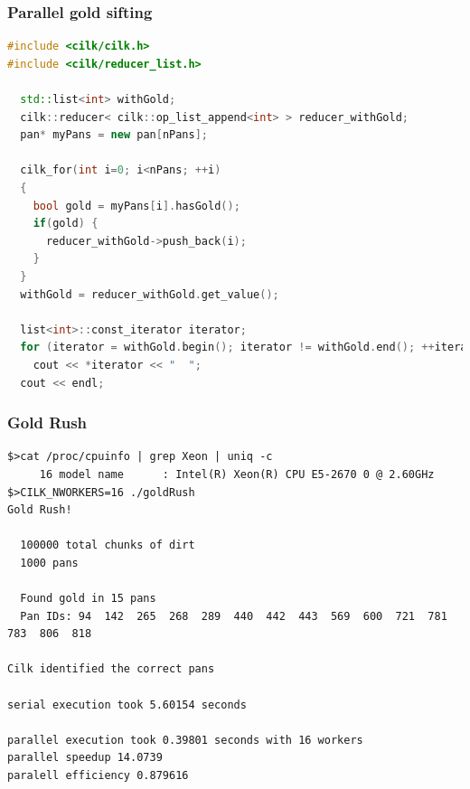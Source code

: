 \documentclass[fleqn,xcolor=table,10pt,final]{beamer}
\begin{document}
\begin{frame}[fragile]
  \frametitle{Parallel gold sifting}
  \begin{lstlisting}[language=C++,basicstyle=\scriptsize]
#include <cilk/cilk.h>
#include <cilk/reducer_list.h>

  std::list<int> withGold;
  cilk::reducer< cilk::op_list_append<int> > reducer_withGold;
  pan* myPans = new pan[nPans];

  cilk_for(int i=0; i<nPans; ++i)
  {
    bool gold = myPans[i].hasGold();
    if(gold) {
      reducer_withGold->push_back(i);
    }
  }
  withGold = reducer_withGold.get_value();

  list<int>::const_iterator iterator;
  for (iterator = withGold.begin(); iterator != withGold.end(); ++iterator)
    cout << *iterator << "  ";
  cout << endl;
  \end{lstlisting}
\end{frame}

\begin{frame}[fragile]
  \frametitle{Gold Rush}
  {\scriptsize
  \begin{verbatim}
$>cat /proc/cpuinfo | grep Xeon | uniq -c
     16 model name      : Intel(R) Xeon(R) CPU E5-2670 0 @ 2.60GHz
$>CILK_NWORKERS=16 ./goldRush
Gold Rush!

  100000 total chunks of dirt
  1000 pans

  Found gold in 15 pans
  Pan IDs: 94  142  265  268  289  440  442  443  569  600  721  781  783  806  818

Cilk identified the correct pans

serial execution took 5.60154 seconds

parallel execution took 0.39801 seconds with 16 workers
parallel speedup 14.0739
paralell efficiency 0.879616
  \end{verbatim}
}
\end{frame}
\end{document}
